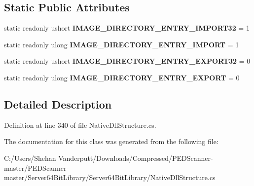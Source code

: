 \subsection*{Static Public Attributes}
\begin{DoxyCompactItemize}
\item 
\mbox{\label{class_class_library_server_1_1_struct_1_1_interop_a1f988dd749571a74a453268b7bd5bb69}} 
static readonly ushort {\bfseries I\+M\+A\+G\+E\+\_\+\+D\+I\+R\+E\+C\+T\+O\+R\+Y\+\_\+\+E\+N\+T\+R\+Y\+\_\+\+I\+M\+P\+O\+R\+T32} = 1
\item 
\mbox{\label{class_class_library_server_1_1_struct_1_1_interop_aadf1595d26b2ba169c6ae9a91971c844}} 
static readonly ulong {\bfseries I\+M\+A\+G\+E\+\_\+\+D\+I\+R\+E\+C\+T\+O\+R\+Y\+\_\+\+E\+N\+T\+R\+Y\+\_\+\+I\+M\+P\+O\+RT} = 1
\item 
\mbox{\label{class_class_library_server_1_1_struct_1_1_interop_a1bacac4010c3c7933c38feddb1108492}} 
static readonly ushort {\bfseries I\+M\+A\+G\+E\+\_\+\+D\+I\+R\+E\+C\+T\+O\+R\+Y\+\_\+\+E\+N\+T\+R\+Y\+\_\+\+E\+X\+P\+O\+R\+T32} = 0
\item 
\mbox{\label{class_class_library_server_1_1_struct_1_1_interop_a26c73da92f92be46d41c15230a75f719}} 
static readonly ulong {\bfseries I\+M\+A\+G\+E\+\_\+\+D\+I\+R\+E\+C\+T\+O\+R\+Y\+\_\+\+E\+N\+T\+R\+Y\+\_\+\+E\+X\+P\+O\+RT} = 0
\end{DoxyCompactItemize}


\subsection{Detailed Description}


Definition at line 340 of file Native\+Dll\+Structure.\+cs.



The documentation for this class was generated from the following file\+:\begin{DoxyCompactItemize}
\item 
C\+:/\+Users/\+Shehan Vanderputt/\+Downloads/\+Compressed/\+P\+E\+D\+Scanner-\/master/\+P\+E\+D\+Scanner-\/master/\+Server64\+Bit\+Library/\+Server64\+Bit\+Library/Native\+Dll\+Structure.\+cs\end{DoxyCompactItemize}
